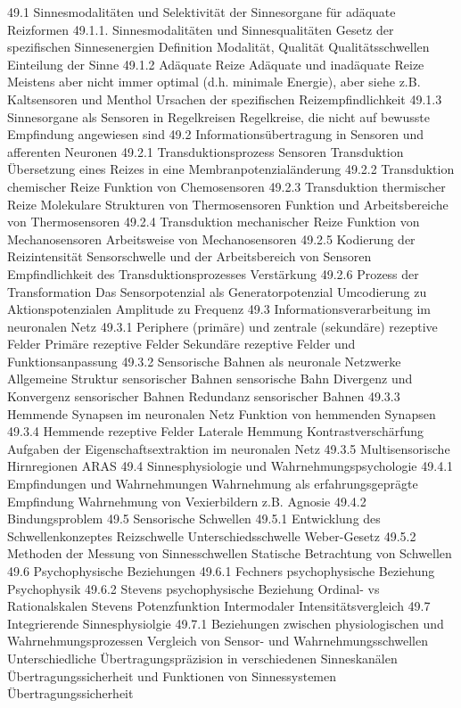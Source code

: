 49.1 Sinnesmodalitäten und Selektivität der Sinnesorgane für adäquate Reizformen
    49.1.1. Sinnesmodalitäten und Sinnesqualitäten
        Gesetz der spezifischen Sinnesenergien
            Definition Modalität, Qualität
        Qualitätsschwellen
        Einteilung der Sinne
    49.1.2 Adäquate Reize
        Adäquate und inadäquate Reize
            Meistens aber nicht immer optimal (d.h. minimale Energie), aber siehe z.B. Kaltsensoren und Menthol
        Ursachen der spezifischen Reizempfindlichkeit
   49.1.3 Sinnesorgane als Sensoren in Regelkreisen
        Regelkreise, die nicht auf bewusste Empfindung angewiesen sind
49.2 Informationsübertragung in Sensoren und afferenten Neuronen
    49.2.1 Transduktionsprozess
        Sensoren
        Transduktion
            Übersetzung eines Reizes in eine Membranpotenzialänderung
    49.2.2 Transduktion chemischer Reize
        Funktion von Chemosensoren
    49.2.3 Transduktion thermischer Reize
        Molekulare Strukturen von Thermosensoren
        Funktion und Arbeitsbereiche von Thermosensoren
    49.2.4 Transduktion mechanischer Reize
        Funktion von Mechanosensoren
        Arbeitsweise von Mechanosensoren
    49.2.5 Kodierung der Reizintensität
        Sensorschwelle und der Arbeitsbereich von Sensoren
        Empfindlichkeit des Transduktionsprozesses
            Verstärkung
    49.2.6 Prozess der Transformation
        Das Sensorpotenzial als Generatorpotenzial
        Umcodierung zu Aktionspotenzialen
            Amplitude zu Frequenz
49.3 Informationsverarbeitung im neuronalen Netz
    49.3.1 Periphere (primäre) und zentrale (sekundäre) rezeptive Felder
        Primäre rezeptive Felder
        Sekundäre rezeptive Felder und Funktionsanpassung
    49.3.2 Sensorische Bahnen als neuronale Netzwerke
        Allgemeine Struktur sensorischer Bahnen
            sensorische Bahn
        Divergenz und Konvergenz sensorischer Bahnen
        Redundanz sensorischer Bahnen
    49.3.3 Hemmende Synapsen im neuronalen Netz
        Funktion von hemmenden Synapsen
    49.3.4 Hemmende rezeptive Felder
        Laterale Hemmung
        Kontrastverschärfung
        Aufgaben der Eigenschaftsextraktion im neuronalen Netz
    49.3.5 Multisensorische Hirnregionen
            ARAS
49.4 Sinnesphysiologie und Wahrnehmungspsychologie
    49.4.1 Empfindungen und Wahrnehmungen
        Wahrnehmung als erfahrungsgeprägte Empfindung
        Wahrnehmung von Vexierbildern
            z.B. Agnosie
    49.4.2 Bindungsproblem
49.5 Sensorische Schwellen
    49.5.1 Entwicklung des Schwellenkonzeptes
        Reizschwelle
        Unterschiedsschwelle
            Weber-Gesetz
    49.5.2 Methoden der Messung von Sinnesschwellen
        Statische Betrachtung von Schwellen
49.6 Psychophysische Beziehungen
    49.6.1 Fechners psychophysische Beziehung
        Psychophysik
    49.6.2 Stevens psychophysische Beziehung
        Ordinal- vs Rationalskalen
        Stevens Potenzfunktion
        Intermodaler Intensitätsvergleich
49.7 Integrierende Sinnesphysiolgie
    49.7.1 Beziehungen zwischen physiologischen und Wahrnehmungsprozessen
        Vergleich von Sensor- und Wahrnehmungsschwellen
        Unterschiedliche Übertragungspräzision in verschiedenen Sinneskanälen
        Übertragungssicherheit und Funktionen von Sinnessystemen
        Übertragungssicherheit
            
